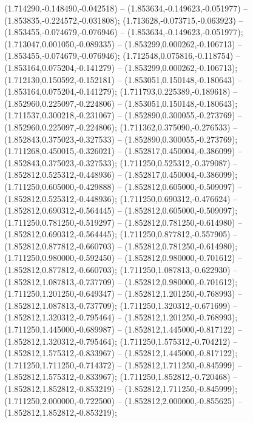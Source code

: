  (1.714290,-0.148490,-0.042518) -- (1.853634,-0.149623,-0.051977) -- (1.853835,-0.224572,-0.031808);
 (1.713628,-0.073715,-0.063923) -- (1.853455,-0.074679,-0.076946) -- (1.853634,-0.149623,-0.051977);
 (1.713047,0.001050,-0.089335) -- (1.853299,0.000262,-0.106713) -- (1.853455,-0.074679,-0.076946);
 (1.712548,0.075816,-0.118754) -- (1.853164,0.075204,-0.141279) -- (1.853299,0.000262,-0.106713);
 (1.712130,0.150592,-0.152181) -- (1.853051,0.150148,-0.180643) -- (1.853164,0.075204,-0.141279);
 (1.711793,0.225389,-0.189618) -- (1.852960,0.225097,-0.224806) -- (1.853051,0.150148,-0.180643);
 (1.711537,0.300218,-0.231067) -- (1.852890,0.300055,-0.273769) -- (1.852960,0.225097,-0.224806);
 (1.711362,0.375090,-0.276533) -- (1.852843,0.375023,-0.327533) -- (1.852890,0.300055,-0.273769);
 (1.711268,0.450015,-0.326021) -- (1.852817,0.450004,-0.386099) -- (1.852843,0.375023,-0.327533);
 (1.711250,0.525312,-0.379087) -- (1.852812,0.525312,-0.448936) -- (1.852817,0.450004,-0.386099);
 (1.711250,0.605000,-0.429888) -- (1.852812,0.605000,-0.509097) -- (1.852812,0.525312,-0.448936);
 (1.711250,0.690312,-0.476624) -- (1.852812,0.690312,-0.564445) -- (1.852812,0.605000,-0.509097);
 (1.711250,0.781250,-0.519297) -- (1.852812,0.781250,-0.614980) -- (1.852812,0.690312,-0.564445);
 (1.711250,0.877812,-0.557905) -- (1.852812,0.877812,-0.660703) -- (1.852812,0.781250,-0.614980);
 (1.711250,0.980000,-0.592450) -- (1.852812,0.980000,-0.701612) -- (1.852812,0.877812,-0.660703);
 (1.711250,1.087813,-0.622930) -- (1.852812,1.087813,-0.737709) -- (1.852812,0.980000,-0.701612);
 (1.711250,1.201250,-0.649347) -- (1.852812,1.201250,-0.768993) -- (1.852812,1.087813,-0.737709);
 (1.711250,1.320312,-0.671699) -- (1.852812,1.320312,-0.795464) -- (1.852812,1.201250,-0.768993);
 (1.711250,1.445000,-0.689987) -- (1.852812,1.445000,-0.817122) -- (1.852812,1.320312,-0.795464);
 (1.711250,1.575312,-0.704212) -- (1.852812,1.575312,-0.833967) -- (1.852812,1.445000,-0.817122);
 (1.711250,1.711250,-0.714372) -- (1.852812,1.711250,-0.845999) -- (1.852812,1.575312,-0.833967);
 (1.711250,1.852812,-0.720468) -- (1.852812,1.852812,-0.853219) -- (1.852812,1.711250,-0.845999);
 (1.711250,2.000000,-0.722500) -- (1.852812,2.000000,-0.855625) -- (1.852812,1.852812,-0.853219);

